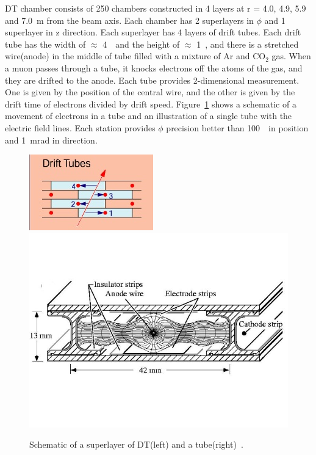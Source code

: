 DT chamber consists of 250 chambers constructed in 4 layers at r = 4.0, 4.9, 5.9 
and 7.0~m from the beam axis. Each chamber has 2 superlayers in $\phi$ and 
1 superlayer in z direction. Each superlayer has 4 layers of drift tubes. 
Each drift tube has the width of $\approx$ 4~\cm\ and the height of $\approx$ 1~\cm, 
and there is a stretched wire(anode) in the middle of tube filled with a mixture of 
Ar and $\textrm{CO}_2$ gas. When a muon passes through a tube, it knocks 
electrons off the atoms of the gas, and they are drifted to the anode.
Each tube provides 2-dimensional measurement. One is given by the position of 
the central wire, and the other is given by the drift time of electrons divided by
drift speed. Figure~\ref{fig:muon_dt} shows a schematic of a 
movement of electrons in a tube and an illustration of a single tube with the
electric field lines. Each station provides $\phi$ precision better than 100~\um\ 
in position and 1~mrad in direction. 
%
\begin{figure}[h] 
\centering
\vspace{1cm}
\includegraphics[height=0.3\textwidth]{figures/DT.jpg} 
\includegraphics[height=0.3\textwidth]{figures/DT_onetube.jpg}
\caption{Schematic of a superlayer of DT(left) and a tube(right)~\cite{Maselli:1196170}.}
\label{fig:muon_dt} 
\end{figure} 

